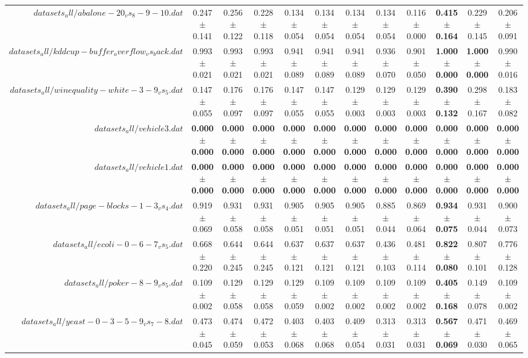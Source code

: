 \begin{table}[!ht]
{\begin{tabular}{r c c c c c c c c c c c}
$datasets_all/abalone-20_vs_8-9-10.dat$ & 0.247 $\pm$ 0.141 & 0.256 $\pm$ 0.122 & 0.228 $\pm$ 0.118 & 0.134 $\pm$ 0.054 & 0.134 $\pm$ 0.054 & 0.134 $\pm$ 0.054 & 0.134 $\pm$ 0.054 & 0.116 $\pm$ 0.000 & \textbf{0.415 $\pm$ 0.164} & 0.229 $\pm$ 0.145 & 0.206 $\pm$ 0.091 \\
$datasets_all/kddcup-buffer_overflow_vs_back.dat$ & 0.993 $\pm$ 0.021 & 0.993 $\pm$ 0.021 & 0.993 $\pm$ 0.021 & 0.941 $\pm$ 0.089 & 0.941 $\pm$ 0.089 & 0.941 $\pm$ 0.089 & 0.936 $\pm$ 0.070 & 0.901 $\pm$ 0.050 & \textbf{1.000 $\pm$ 0.000} & \textbf{1.000 $\pm$ 0.000} & 0.990 $\pm$ 0.016 \\
$datasets_all/winequality-white-3-9_vs_5.dat$ & 0.147 $\pm$ 0.055 & 0.176 $\pm$ 0.097 & 0.176 $\pm$ 0.097 & 0.147 $\pm$ 0.055 & 0.147 $\pm$ 0.055 & 0.129 $\pm$ 0.003 & 0.129 $\pm$ 0.003 & 0.129 $\pm$ 0.003 & \textbf{0.390 $\pm$ 0.132} & 0.298 $\pm$ 0.167 & 0.183 $\pm$ 0.082 \\
$datasets_all/vehicle3.dat$ & \textbf{0.000 $\pm$ 0.000} & \textbf{0.000 $\pm$ 0.000} & \textbf{0.000 $\pm$ 0.000} & \textbf{0.000 $\pm$ 0.000} & \textbf{0.000 $\pm$ 0.000} & \textbf{0.000 $\pm$ 0.000} & \textbf{0.000 $\pm$ 0.000} & \textbf{0.000 $\pm$ 0.000} & \textbf{0.000 $\pm$ 0.000} & \textbf{0.000 $\pm$ 0.000} & \textbf{0.000 $\pm$ 0.000} \\
$datasets_all/vehicle1.dat$ & \textbf{0.000 $\pm$ 0.000} & \textbf{0.000 $\pm$ 0.000} & \textbf{0.000 $\pm$ 0.000} & \textbf{0.000 $\pm$ 0.000} & \textbf{0.000 $\pm$ 0.000} & \textbf{0.000 $\pm$ 0.000} & \textbf{0.000 $\pm$ 0.000} & \textbf{0.000 $\pm$ 0.000} & \textbf{0.000 $\pm$ 0.000} & \textbf{0.000 $\pm$ 0.000} & \textbf{0.000 $\pm$ 0.000} \\
$datasets_all/page-blocks-1-3_vs_4.dat$ & 0.919 $\pm$ 0.069 & 0.931 $\pm$ 0.058 & 0.931 $\pm$ 0.058 & 0.905 $\pm$ 0.051 & 0.905 $\pm$ 0.051 & 0.905 $\pm$ 0.051 & 0.885 $\pm$ 0.044 & 0.869 $\pm$ 0.064 & \textbf{0.934 $\pm$ 0.075} & 0.931 $\pm$ 0.044 & 0.900 $\pm$ 0.073 \\
$datasets_all/ecoli-0-6-7_vs_5.dat$ & 0.668 $\pm$ 0.220 & 0.644 $\pm$ 0.245 & 0.644 $\pm$ 0.245 & 0.637 $\pm$ 0.121 & 0.637 $\pm$ 0.121 & 0.637 $\pm$ 0.121 & 0.436 $\pm$ 0.103 & 0.481 $\pm$ 0.114 & \textbf{0.822 $\pm$ 0.080} & 0.807 $\pm$ 0.101 & 0.776 $\pm$ 0.128 \\
$datasets_all/poker-8-9_vs_5.dat$ & 0.109 $\pm$ 0.002 & 0.129 $\pm$ 0.058 & 0.129 $\pm$ 0.058 & 0.129 $\pm$ 0.059 & 0.109 $\pm$ 0.002 & 0.109 $\pm$ 0.002 & 0.109 $\pm$ 0.002 & 0.109 $\pm$ 0.002 & \textbf{0.405 $\pm$ 0.168} & 0.149 $\pm$ 0.078 & 0.109 $\pm$ 0.002 \\
$datasets_all/yeast-0-3-5-9_vs_7-8.dat$ & 0.473 $\pm$ 0.045 & 0.474 $\pm$ 0.059 & 0.472 $\pm$ 0.053 & 0.403 $\pm$ 0.068 & 0.403 $\pm$ 0.068 & 0.409 $\pm$ 0.054 & 0.313 $\pm$ 0.031 & 0.313 $\pm$ 0.031 & \textbf{0.567 $\pm$ 0.069} & 0.471 $\pm$ 0.030 & 0.469 $\pm$ 0.065 \\
\end{tabular}}
\end{table}
